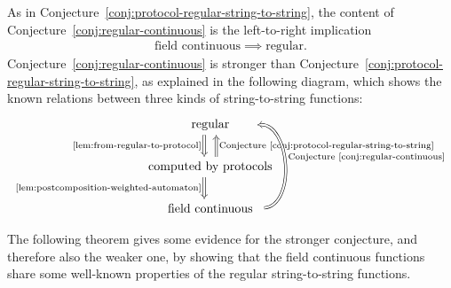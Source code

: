As in Conjecture~\ref{conj:protocol-regular-string-to-string}, the content of Conjecture~\ref{conj:regular-continuous} is the left-to-right implication
\begin{align*}
\text{field continuous} \implies \text{regular}.
\end{align*}
Conjecture~\ref{conj:regular-continuous} is stronger than Conjecture~\ref{conj:protocol-regular-string-to-string}, as explained in the following diagram, which shows the known relations between three kinds of string-to-string functions:
\[
\begin{tikzcd}
\text{~~~~regular~~~~}
\ar[d,Rightarrow,shift right=2, "\text{\cref{lem:from-regular-to-protocol}}"']
\\
\text{computed by protocols}
\ar[d,Rightarrow, shift right=2, "\text{\cref{lem:postcomposition-weighted-automaton}}"']
\ar[u,Rightarrow, shift right=2,"\text{Conjecture~\ref{conj:protocol-regular-string-to-string}}"']
\\ 
\text{field continuous} 
\ar[uu,bend right=89, Rightarrow, shift right=2,"\text{Conjecture~\ref{conj:regular-continuous}}"']
\end{tikzcd}
\]


The following theorem gives some evidence for the stronger conjecture,  and
therefore also the weaker one, by showing that the field continuous functions
share some well-known properties of the regular string-to-string functions. 

\evidencefortheconjecture*




